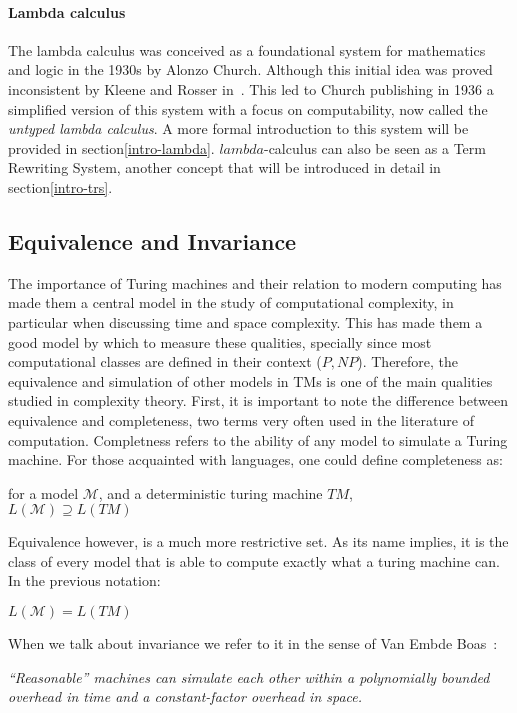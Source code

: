 \documentclass[12pt]{article}
\begin{document}
\paragraph{Lambda calculus}
The lambda calculus was conceived as a foundational system for mathematics and logic in the 1930s by Alonzo Church. Although this initial idea was proved inconsistent by Kleene and Rosser in~\cite{rosser-kleene-inconsistency}. This led to Church publishing in 1936 a simplified version of this system with a focus on computability, now called the \textit{untyped lambda calculus}. A more formal introduction to this system will be provided in section\ref{intro-lambda}. $lambda$-calculus can also be seen as a Term Rewriting System, another concept that will be introduced in detail in section\ref{intro-trs}.

\subsection{Equivalence and Invariance}
The importance of Turing machines and their relation to modern computing has made them a central model in the study of computational complexity, in particular when discussing time and space complexity. This has made them a good model by which to measure these qualities, specially since most computational classes are defined in their context ($P, NP$). Therefore, the equivalence and simulation of other models in TMs is one of the main qualities studied in complexity theory.
First, it is important to note the difference between equivalence and completeness, two terms very often used in the literature of computation. Completness refers to the ability of any model to simulate a Turing machine. For those acquainted with languages, one could define completeness as:
\begin{center}
  for a model $\mathcal{M}$, and a deterministic turing machine $TM$, \\
  $L(\mathcal{M}) \supseteq L(TM)$
\end{center}
Equivalence however, is a much more restrictive set. As its name implies, it is the class of every model that is able to compute exactly what a turing machine can. In the previous notation:
\begin{center}
  $L(\mathcal{M}) = L(TM)$
\end{center}
When we talk about invariance we refer to it in the sense of Van Embde Boas~\cite{machine-models}: \\
\begin{center}
 \textit{\enquote{Reasonable} machines can simulate each other within a polynomially
bounded overhead in time and a constant-factor overhead in space.}
\end{center}
\end{document}
